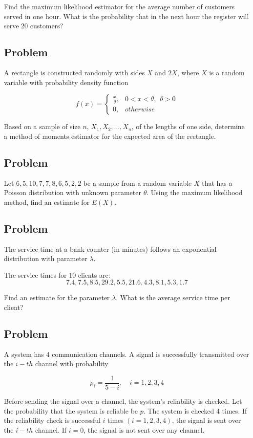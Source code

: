 \documentclass[a4paper, 12pt]{article}
\begin{document}
Find the maximum likelihood estimator for the average number of customers served in one hour. What is the probability that in the next hour the register will serve 20 customers?

\subsection{Problem}
A rectangle is constructed randomly with sides $X$ and $2X$, where $X$ is a random variable with probability density function 


\[ 
f(x) = 
\begin{cases}
  \frac{x}{\theta}, & 0 < x < \theta, \ \ \theta > 0 \\
  0, & otherwise
\end{cases}  
\]

Based on a sample of size $n$, $X_1, X_2, \dots, X_n$, of the lengths of one side, determine a method of moments estimator for the expected area of the rectangle.


\subsection{Problem}
Let $6, 5, 10, 7, 7, 8, 6, 5, 2, 2$ be a sample from a random variable $X$ that has a Poisson distribution with unknown parameter $\theta$. Using the maximum likelihood method, find an estimate for $E(X)$.


\subsection{Problem}
The service time at a bank counter (in minutes) follows an exponential distribution with parameter $\lambda$.

The service times for 10 clients are:
\[
7.4, 7.5, 8.5, 29.2, 5.5, 21.6, 4.3, 8.1, 5.3, 1.7
\]

Find an estimate for the parameter $\lambda$. What is the average service time per client?


\subsection{Problem}
A system has 4 communication channels. A signal is successfully transmitted over the $i-th$ channel with probability

\[
p_i = \frac{1}{5-i}, \quad i=1,2,3,4
\]

Before sending the signal over a channel, the system's reliability is checked. Let the probability that the system is reliable be $p$. The system is checked 4 times. If the reliability check is successful $i$ times $(i = 1,2,3,4)$, the signal is sent over the $i-th$ channel. If $i=0$, the signal is not sent over any channel. \\
\end{document}
